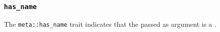 
\subsubsection{\texttt{has\_name}}

The \texttt{meta::has\_name}
trait indicates that the  passed as argument is a .


